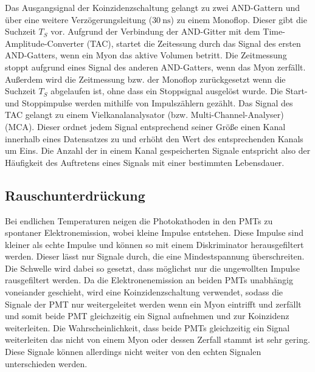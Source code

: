 Das Ausgangsignal der Koinzidenzschaltung gelangt zu zwei AND-Gattern und über eine weitere Verzögerungsleitung ($\qty{30}{\nano\second}$) zu einem Monoflop. Dieser gibt die Suchzeit $T_S$ vor.
Aufgrund der Verbindung der AND-Gitter mit dem Time-Amplitude-Converter (TAC), startet die Zeitessung durch das Signal des ersten AND-Gatters,
wenn ein Myon das aktive Volumen betritt. Die Zeitmessung stoppt aufgrund eines Signal des anderen AND-Gatters, wenn das Myon zerfällt. 
Außerdem wird die Zeitmessung bzw. der Monoflop zurückgesetzt wenn die Suchzeit $T_S$ abgelaufen ist, ohne dass ein Stoppsignal ausgelöst wurde.
Die Start- und Stoppimpulse werden mithilfe von Impulszählern gezählt.
Das Signal des TAC gelangt zu einem Vielkanalanalysator (bzw. Multi-Channel-Analyser) (MCA). Dieser ordnet jedem Signal entsprechend
seiner Größe einen Kanal innerhalb eines Datensatzes zu und erhöht den Wert des entsprechenden Kanals um Eins. Die Anzahl der in einem Kanal
gespeicherten Signale entspricht also der Häufigkeit des Auftretens eines Signals mit einer bestimmten Lebensdauer.


\subsection{Rauschunterdrückung}
\label{subsec:Rauschunterdrückung}
Bei endlichen Temperaturen neigen die Photokathoden in den PMTs zu spontaner Elektronemission, wobei kleine Impulse entstehen.
Diese Impulse sind kleiner als \dq echte \dq Impulse und können so mit einem Diskriminator herausgefiltert werden.
Dieser lässt nur Signale durch, die eine Mindestspannung überschreiten. Die Schwelle wird
dabei so gesetzt, dass möglichst nur die ungewollten Impulse rausgefiltert werden. Da die Elektronenemission an beiden PMTs unabhängig
voneiander geschieht, wird eine Koinzidenzschaltung verwendet, sodass die Signale der PMT
nur weitergeleitet werden wenn ein Myon eintrifft und zerfällt und somit beide PMT gleichzeitig ein Signal aufnehmen und zur Koinzidenz
weiterleiten. Die Wahrscheinlichkeit, dass beide PMTs gleichzeitig ein Signal weiterleiten das nicht von einem Myon oder dessen Zerfall
stammt ist sehr gering. Diese Signale können allerdings nicht weiter von den echten Signalen unterschieden werden.


